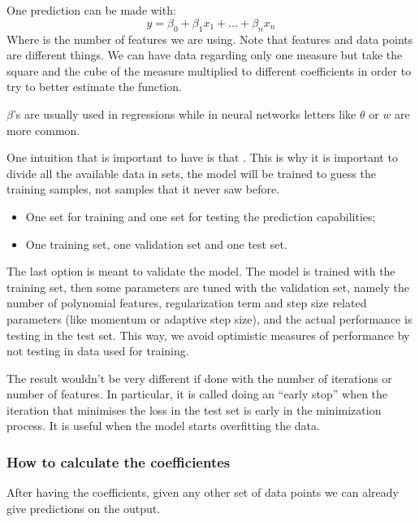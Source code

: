 One prediction can be made with:
\begin{equation}
    \hat{y} = \beta_0 + \beta_1 x_1 + \dots + \beta_n x_n
\end{equation}
Where  is the number of features we are using. Note that features and data points are different things. We can have data regarding only one measure but take the square and the cube of the measure multiplied to different coefficients in order to try to better estimate the function.

$\beta$'s are usually used in regressions while in neural networks letters like $\theta$ or $w$ are more common.


One intuition that is important to have is that . This is why it is important to divide all the available data in sets, the model will be trained to guess the training samples, not samples that it never saw before.
\begin{itemize}
    \item One set for training and one set for testing the prediction capabilities;
    \item One training set, one validation set and one test set.
\end{itemize}

The last option is meant to validate the model. The model is trained with the training set, then some parameters are tuned with the validation set, namely the number of polynomial features, regularization term and step size related parameters (like momentum or adaptive step size), and the actual performance is testing in the test set. This way, we avoid optimistic measures of performance by not testing in data used for training. 


The result wouldn't be very different if done with the number of iterations or number of features. In particular, it is called doing an ``early stop'' when the iteration that minimises the loss in the test set is early in the minimization process. It is useful when the model starts overfitting the data.



\subsubsection{How to calculate the coefficientes}
\label{sec:calcBetas}
After having the coefficients, given any other set of data points we can already give predictions on the output.

